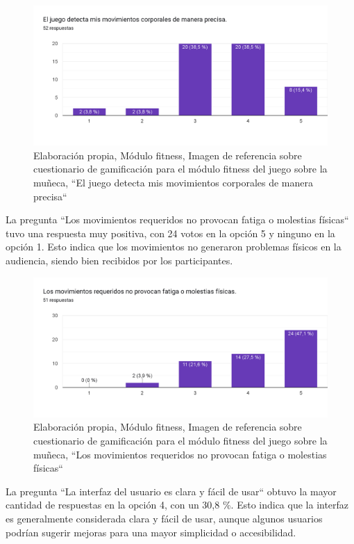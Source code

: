     \begin{figure}[H]
  \centering
  \includegraphics[width=0.7\linewidth]{Imagenes/fc4.png}
  \caption{Elaboración propia, Módulo fitness, Imagen de referencia sobre cuestionario  de gamificación para el módulo fitness del juego sobre la muñeca, ``El juego detecta mis movimientos corporales de manera precisa``}
  \label{fig:cuestionario4fitness}
\end{figure}

La pregunta ``Los movimientos requeridos no provocan fatiga o molestias físicas`` tuvo una respuesta muy positiva, con 24 votos en la opción 5 y ninguno en la opción 1. Esto indica que los movimientos no generaron problemas físicos en la audiencia, siendo bien recibidos por los participantes.

    \begin{figure}[H]
  \centering
  \includegraphics[width=0.7\linewidth]{Imagenes/fc5.png}
  \caption{Elaboración propia, Módulo fitness, Imagen de referencia sobre cuestionario  de gamificación para el módulo fitness del juego sobre la muñeca, ``Los movimientos requeridos no provocan fatiga o molestias físicas``}
  \label{fig:cuestionario5fitness}
\end{figure}


La pregunta ``La interfaz del usuario es clara y fácil de usar`` obtuvo la mayor cantidad de respuestas en la opción 4, con un 30,8 \%. Esto indica que la interfaz es generalmente considerada clara y fácil de usar, aunque algunos usuarios podrían sugerir mejoras para una mayor simplicidad o accesibilidad.

